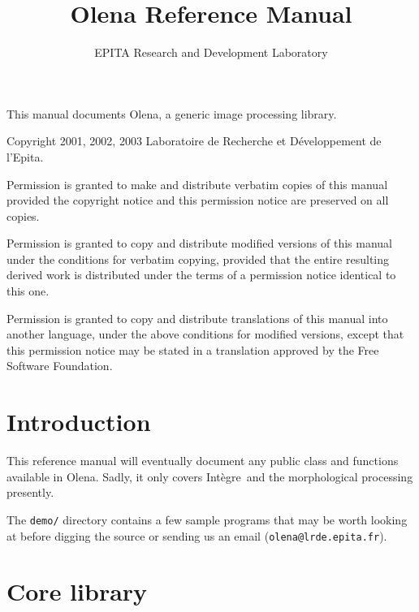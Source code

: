 \documentclass{book}
\newcommand\var\textit
\newcommand{\integre}{Int\`egre}
\begin{document}
\title{Olena Reference Manual}
\author{EPITA Research and Development Laboratory}
\maketitle


This manual documents Olena, a generic image processing library.

Copyright 2001, 2002, 2003  Laboratoire de Recherche et D\'eveloppement de l'Epita.

Permission is granted to make and distribute verbatim
copies of this manual provided the copyright notice and
this permission notice are preserved on all copies.


Permission is granted to copy and distribute modified versions of this
manual under the conditions for verbatim copying, provided that the
entire resulting derived work is distributed under the terms of a
permission notice identical to this one.

Permission is granted to copy and distribute
translations of this manual into another language,
under the above conditions for modified versions,
except that this permission notice may be stated in a
translation approved by the Free Software Foundation.

\newpage

\tableofcontents

\newpage

\chapter{Introduction}

This reference manual will eventually document any public class and
functions available in Olena. Sadly, it only covers \integre\ and the
morphological processing presently.

The \texttt{demo/} directory contains a few sample programs that may be
worth looking at before digging the source or sending us an email
(\texttt{olena@lrde.epita.fr}).

\chapter{Core library}
\end{document}
